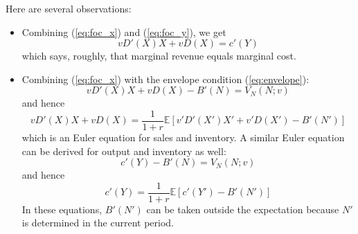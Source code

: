 \documentclass[12pt]{article}
\begin{document}
Here are several observations:
\begin{itemize}
	\item Combining (\ref{eq:foc_x}) and (\ref{eq:foc_y}), we get 
	\begin{equation} \label{eq:mr_mc}
		v D'(X) X + v D(X) = c'(Y)
	\end{equation}
which says, roughly, that marginal revenue equals marginal cost.
\item Combining (\ref{eq:foc_x}) with the envelope condition (\ref{eq:envelope}):
\[v D'(X) X + v D(X) - B'(N) = V_N(N; v)\]
and hence
\begin{equation}
	v D'(X) X + v D(X) = \frac{1}{1+r} \mathbb{E}[v' D'(X') X' + v' D(X') - B'(N')]
\end{equation}
which is an Euler equation for sales and inventory. A similar Euler equation can be derived for output and inventory as well:
\[c'(Y) - B'(N) = V_N(N; v) \]
and hence
\begin{equation} \label{eq:cost_EE}
	c'(Y) = \frac{1}{1+r} \mathbb{E}[c'(Y') - B'(N')]
\end{equation}
In these equations, $B'(N')$ can be taken outside the expectation because $N'$ is determined in the current period.


\end{itemize}
\end{document}

